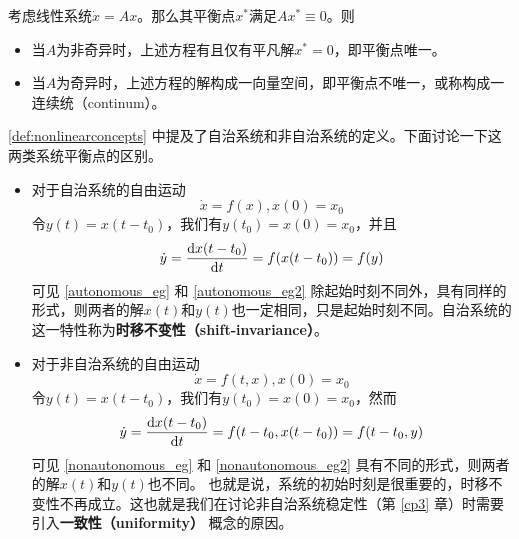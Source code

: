 \begin{example}[线性系统的平衡点]
  考虑线性系统$\dot{x}=Ax$。那么其平衡点$x^\ast$满足$Ax^\ast\equiv 0$。则
  \begin{itemize}[leftmargin=1em]
    \item 当$A$为非奇异时，上述方程有且仅有平凡解$x^\ast=0$，即平衡点唯一。
    \item 当$A$为奇异时，上述方程的解构成一向量空间，即平衡点不唯一，或称构成一连续统（continum）。
  \end{itemize}
\end{example}

\ref{def:nonlinearconcepts} 中提及了自治系统和非自治系统的定义。下面讨论一下这两类系统平衡点的区别。
\begin{itemize}[leftmargin=2em]
  \item 对于自治系统的自由运动\begin{equation}\label{autonomous_eg}
    \dot{x}=f(x),x(0)=x_0
  \end{equation}
  令$y(t)=x(t-t_0)$，我们有$y(t_0)=x(0)=x_0$，并且\begin{equation}\label{autonomous_eg2}
    \dot{y}=\frac{\mathop{}\!\mathrm{d} x(t-t_0)}{\mathop{}\!\mathrm{d} t}=f(x(t-t_0))=f(y)
  \end{equation}
  可见 \eqref{autonomous_eg} 和 \eqref{autonomous_eg2} 除起始时刻不同外，具有同样的形式，则两者的解$x(t)$和$y(t)$也一定相同，只是起始时刻不同。自治系统的这一特性称为{\bf 时移不变性（shift-invariance）}。
  \item 对于非自治系统的自由运动\begin{equation}\label{nonautonomous_eg}
    \dot{x}=f(t,x),x(0)=x_0
  \end{equation}
  令$y(t)=x(t-t_0)$，我们有$y(t_0)=x(0)=x_0$，然而\begin{equation}\label{nonautonomous_eg2}
    \dot{y}=\frac{\mathop{}\!\mathrm{d} x(t-t_0)}{\mathop{}\!\mathrm{d} t}=f(t-t_0,x(t-t_0))=f(t-t_0,y)
  \end{equation}
  可见 \eqref{nonautonomous_eg} 和 \eqref{nonautonomous_eg2} 具有不同的形式，则两者的解$x(t)$和$y(t)$也不同。
  也就是说，系统的初始时刻是很重要的，时移不变性不再成立。这也就是我们在讨论非自治系统稳定性（第 \ref{cp3} 章）时需要引入{\bf 一致性（uniformity）}
  概念的原因。
\end{itemize}
